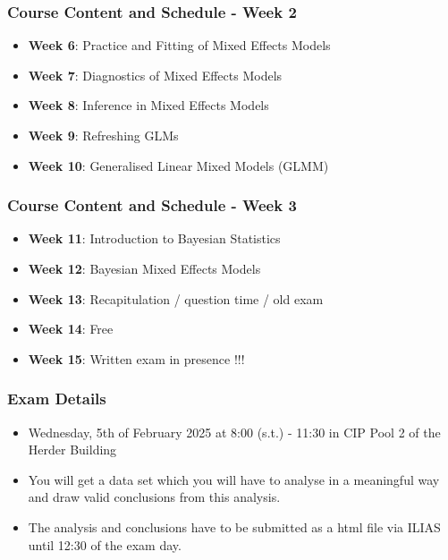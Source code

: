 \documentclass{beamer}
\begin{document}
\begin{frame}
\frametitle{Course Content and Schedule - Week 2}
\begin{itemize}
    \item \textbf{Week 6}: Practice and Fitting of Mixed Effects Models
    \item \textbf{Week 7}: Diagnostics of Mixed Effects Models
    \item \textbf{Week 8}: Inference in Mixed Effects Models
    \item \textbf{Week 9}: Refreshing GLMs
    \item \textbf{Week 10}: Generalised Linear Mixed Models (GLMM)
\end{itemize}
\end{frame}

\begin{frame}
\frametitle{Course Content and Schedule - Week 3}
\begin{itemize}
    \item \textbf{Week 11}: Introduction to Bayesian Statistics
    \item \textbf{Week 12}: Bayesian Mixed Effects Models
    \item \textbf{Week 13}: Recapitulation / question time / old exam
    \item \textbf{Week 14}: Free
    \item \textbf{Week 15}: Written exam in presence !!!
\end{itemize}
\end{frame}

\begin{frame}
\frametitle{Exam Details}
\begin{itemize}
    \item Wednesday, 5th of February 2025 at 8:00 (s.t.) - 11:30 in CIP Pool 2 of the Herder Building
    \item You will get a data set which you will have to analyse in a meaningful way and draw valid conclusions from this analysis.
    \item The analysis and conclusions have to be submitted as a html file via ILIAS until 12:30 of the exam day.
\end{itemize}
\vspace{2em}
\begin{center}
    \textbf{\color{red}{Register for the exam latest on ... }}
\end{center}
\end{frame}
\end{document}
